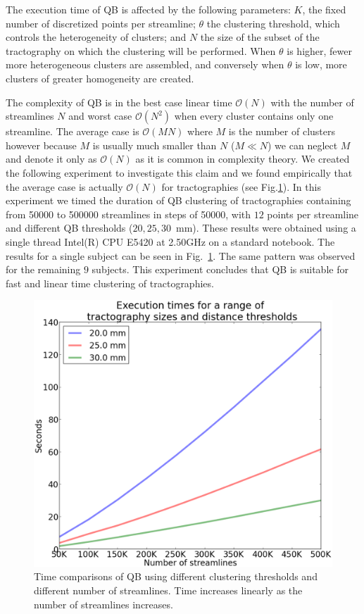 \documentclass{bioinfo}
\begin{document}
The execution time of QB is affected by the following parameters: $K$,
the fixed number of discretized points per streamline; $\theta$ the
clustering threshold, which controls the heterogeneity of clusters; and
$N$ the size of the subset of the tractography on which the clustering
will be performed. When $\theta$ is higher, fewer more heterogeneous
clusters are assembled, and conversely when $\theta$ is low, more
clusters of greater homogeneity are created.

The complexity of QB is in the best case linear time $\mathcal{O}(N)$
with the number of streamlines $N$ and worst case $\mathcal{O}(N^{2})$
when every cluster contains only one streamline. The average case is
$\mathcal{O}(MN)$ where $M$ is the number of clusters however because
$M$ is usually much smaller than $N$ ($M\ll N$) we can neglect $M$ and
denote it only as $\mathcal{O}(N)$ as it is common in complexity
theory. We created the following experiment to investigate this claim
and we found empirically that the average case is actually
$\mathcal{O}(N)$ for tractographies (see Fig.\ref{Flo:Speed1}).  In this
experiment we timed the duration of QB clustering of tractographies
containing from \num{50000} to \num{500000} streamlines in steps of
\num{50000}, with $12$ points per streamline and different QB thresholds
($20,25,30$~mm). These results were obtained using a single thread
Intel(R) CPU E5420 at 2.50GHz on a standard notebook. The results for a
single subject can be seen in Fig.~\ref{Flo:Speed1}. The same pattern
was observed for the remaining $9$ subjects. This experiment concludes
that QB is suitable for fast and linear time clustering of
tractographies.

\begin{figure}
\noindent \begin{centering}
\includegraphics[scale=0.3]{Figures/Fig_3_timings}
\par\end{centering}
\caption{Time comparisons of QB using different clustering thresholds and
  different number of streamlines. Time increases linearly as the number
  of streamlines increases. \label{Flo:Speed1}}
\end{figure}
\end{document}
